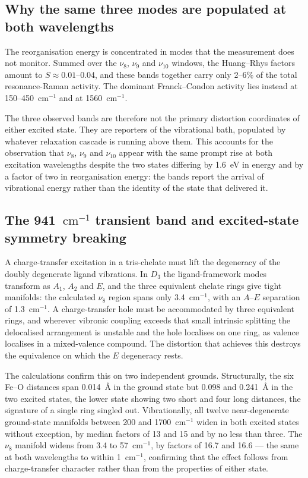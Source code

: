 \documentclass[11pt,a4paper]{article}
\newcommand{\wn}{\ensuremath{\mathrm{cm^{-1}}}}
\begin{document}
\subsection{Why the same three modes are populated at both wavelengths}

The reorganisation energy is concentrated in modes that the measurement does
not monitor. Summed over the $\nu_8$, $\nu_9$ and $\nu_{10}$ windows, the
Huang--Rhys factors amount to $S \approx 0.01$--0.04, and these bands together
carry only 2--6\% of the total resonance-Raman activity. The dominant
Franck--Condon activity lies instead at 150--450~\wn{} and at 1560~\wn{}.

The three observed bands are therefore not the primary distortion coordinates
of either excited state. They are reporters of the vibrational bath, populated
by whatever relaxation cascade is running above them. This accounts for the
observation that $\nu_8$, $\nu_9$ and $\nu_{10}$ appear with the same prompt
rise at both excitation wavelengths despite the two states differing by
1.6~eV in energy and by a factor of two in reorganisation energy: the bands
report the arrival of vibrational energy rather than the identity of the state
that delivered it.

\subsection{The 941~\wn{} transient band and excited-state symmetry breaking}

A charge-transfer excitation in a tris-chelate must lift the degeneracy of the
doubly degenerate ligand vibrations. In $D_3$ the ligand-framework modes
transform as $A_1$, $A_2$ and $E$, and the three equivalent chelate rings give
tight manifolds: the calculated $\nu_8$ region spans only 3.4~\wn{}, with an
$A$--$E$ separation of 1.3~\wn{}. A charge-transfer hole must be accommodated
by three equivalent rings, and wherever vibronic coupling exceeds that small
intrinsic splitting the delocalised arrangement is unstable and the hole
localises on one ring, as valence localises in a mixed-valence compound. The
distortion that achieves this destroys the equivalence on which the $E$
degeneracy rests.

The calculations confirm this on two independent grounds. Structurally, the six
Fe--O distances span 0.014~\AA{} in the ground state but 0.098 and 0.241~\AA{}
in the two excited states, the lower state showing two short and four long
distances, the signature of a single ring singled out. Vibrationally, all
twelve near-degenerate ground-state manifolds between 200 and 1700~\wn{} widen
in both excited states without exception, by median factors of 13 and 15 and by
no less than three. The $\nu_8$ manifold widens from 3.4 to 57~\wn{}, by
factors of 16.7 and 16.6 --- the same at both wavelengths to within 1~\wn{},
confirming that the effect follows from charge-transfer character rather than
from the properties of either state.
\end{document}
